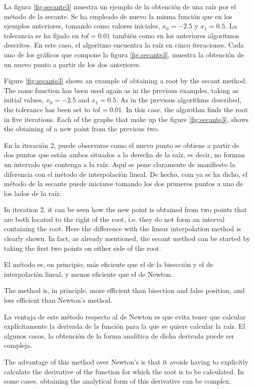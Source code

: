 \begin{paracol}{2}
La figura \ref{fig:secante3} muestra un ejemplo de la obtención de una raíz por el método de la secante. Se ha empleado de nuevo la misma función que en los ejemplos anteriores, tomando como valores iniciales, $x_0=-2.5$ y $x_1=0.5$. La tolerancia se ha fijado en $tol=0.01$ también como en los anteriores algoritmos descritos. En este caso, el algoritmo encuentra la raíz en cinco iteraciones. Cada uno de los gráficos que compone la figura \ref{fig:secante3}, muestra la obtención de un nuevo punto a partir de los dos anteriores. 

    \switchcolumn
Figure \ref{fig:secante3} shows an example of obtaining a root by the secant method. The same function has been used again as in the previous examples, taking as initial values, $x_0=-2.5$ and $x_1=0.5$. As in the previous algorithms described, the tolerance has been set to $tol=0.01$. In this case, the algorithm finds the root in five iterations. Each of the graphs that make up the figure \ref{fig:secante3}, shows the obtaining of a new point from the previous two. 
    \switchcolumn

En la iteración 2, puede observarse como el nuevo punto se obtiene a partir de dos puntos que están ambos situados a la derecha de la raíz, es decir, no forman un intervalo que contenga a la raíz.  Aquí se pone claramente de manifiesto la diferencia con el método de interpolación lineal. De hecho, com ya se ha dicho, el método de la secante puede iniciarse tomando los dos primeros puntos a uno de los lados de la raíz.

\switchcolumn
In iteration 2, it can be seen how the new point is obtained from two points that are both located to the right of the root, i.e. they do not form an interval containing the root.  Here the difference with the linear interpolation method is clearly shown. In fact, as already mentioned, the secant method can be started by taking the first two points on either side of the root.

\switchcolumn
 El método es, en principio, más eficiente que el de la bisección y el de interpolación lineal, y menos eficiente que el de Newton.
\switchcolumn

 The method is, in principle, more efficient than bisection and false position, and less efficient than Newton's method.

 \switchcolumn
 La ventaja de este método respecto al de Newton es que evita tener que calcular explícitamente la derivada de la función para la que se quiere calcular la raíz. El algunos casos, la obtención de la forma analítica de dicha derivada puede ser compleja.   
\switchcolumn

The advantage of this method over Newton's is that it avoids having to explicitly calculate the derivative of the function for which the root is to be calculated. In some cases, obtaining the analytical form of this derivative can be complex.  

\end{paracol}


